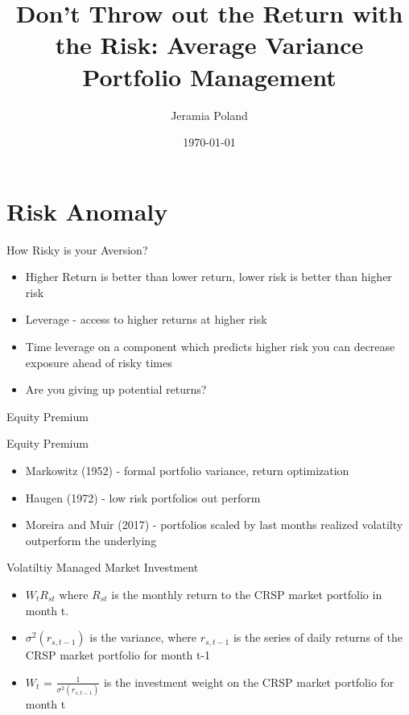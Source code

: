\documentclass{beamer}
\begin{document}
\title[Average Variance]{Don't Throw out the Return with the Risk: Average Variance Portfolio Management}   
\author[J. Poland]{Jeramia Poland} 
\date{\today}

\begin{frame}
\titlepage
\end{frame}

\section{Risk Anomaly}

\begin{frame}{How Risky is your Aversion?}
	\begin{itemize}[<+->]
		\item Higher Return is better than lower return, lower risk is better than higher risk
		\item Leverage - access to higher returns at higher risk
		\item Time leverage on a component which predicts higher risk you can decrease exposure ahead of risky times
		\item Are you giving up potential returns?
	\end{itemize}
\end{frame}

\begin{frame}{Equity Premium}
	\begin{block}{Equity Premium}
\begin{itemize}
	\item Markowitz (1952) - formal portfolio variance, return optimization
	\item Haugen (1972) - low risk portfolios out perform
	\item Moreira and Muir (2017) - portfolios scaled by last months realized volatilty outperform the underlying
\end{itemize}
	\end{block}
	\begin{block}{Volatiltiy Managed Market Investment}
		\begin{itemize}
		\item $W_{t}R_{st}$ where $R_{st}$ is the monthly return to the CRSP market portfolio in month t.
		\item $\sigma^2(r_{s,t-1})$ is the variance, where $r_{s,t-1}$ is the series of daily returns of the CRSP market portfolio for month t-1
		\item $W_{t}$ = $\frac{1}{\sigma^2(r_{s,t-1})}$ is the investment weight on the CRSP market portfolio for month t
	\end{itemize}
	\end{block}
\end{frame}
\end{document}
